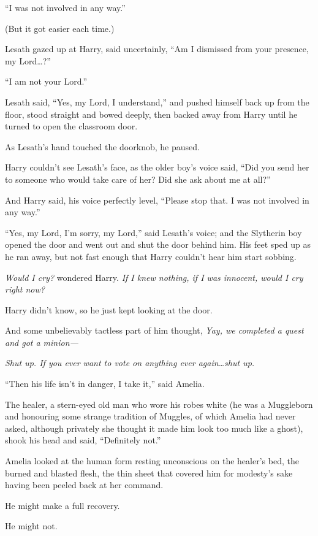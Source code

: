 “I was not involved in any way.”

(But it got easier each time.)

Lesath gazed up at Harry, said uncertainly, “Am I dismissed from your presence, my Lord…?”

“I am not your Lord.”

Lesath said, “Yes, my Lord, I understand,” and pushed himself back up from the floor, stood straight and bowed deeply, then backed away from Harry until he turned to open the classroom door.

As Lesath’s hand touched the doorknob, he paused.

Harry couldn’t see Lesath’s face, as the older boy’s voice said, “Did you send her to someone who would take care of her? Did she ask about me at all?”

And Harry said, his voice perfectly level, “Please stop that. I was not involved in any way.”

“Yes, my Lord, I’m sorry, my Lord,” said Lesath’s voice; and the Slytherin boy opened the door and went out and shut the door behind him. His feet sped up as he ran away, but not fast enough that Harry couldn’t hear him start sobbing.

\emph{Would I cry?} wondered Harry. \emph{If I knew nothing, if I was innocent, would I cry right now?}

Harry didn’t know, so he just kept looking at the door.

And some unbelievably tactless part of him thought, \emph{Yay, we completed a quest and got a minion—}

\emph{Shut up. If you ever want to vote on anything ever again…shut up.}


“Then his life isn’t in danger, I take it,” said Amelia.

The healer, a stern-eyed old man who wore his robes white (he was a Muggleborn and honouring some strange tradition of Muggles, of which Amelia had never asked, although privately she thought it made him look too much like a ghost), shook his head and said, “Definitely not.”

Amelia looked at the human form resting unconscious on the healer’s bed, the burned and blasted flesh, the thin sheet that covered him for modesty’s sake having been peeled back at her command.

He might make a full recovery.

He might not.

